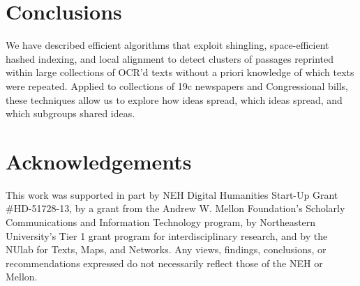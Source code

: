 \documentclass[pdftex,11pt]{article}
\begin{document}
\section{Conclusions}
\label{sec:conclusions}

We have described efficient algorithms that exploit shingling,
space-efficient hashed indexing, and local alignment to detect
clusters of passages reprinted within large collections of OCR'd texts
without a priori knowledge of which texts were repeated.  Applied to
collections of 19c newspapers and Congressional bills, these
techniques allow us to explore how ideas spread, which ideas spread,
and which subgroups shared ideas.

\section*{Acknowledgements}

This work was supported in part by NEH Digital Humanities Start-Up
Grant \#HD-51728-13, by a grant from the Andrew W. Mellon Foundation's
Scholarly Communications and Information Technology program, by
Northeastern University's Tier 1 grant program for interdisciplinary
research, and by the NUlab for Texts, Maps, and Networks.  Any views,
findings, conclusions, or recommendations expressed do not necessarily
reflect those of the NEH or Mellon.



\end{document}
